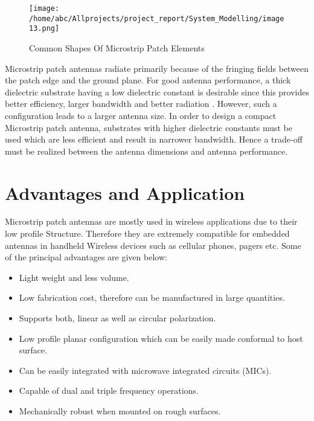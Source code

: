 \documentclass[12pt]{article}
\begin{document}
          \begin{figure}[H]
          	\centering
          	\texttt{[image: /home/abc/Allprojects/project\_report/System\_Modelling/image13.png]}
          	\caption{Common Shapes Of Microstrip Patch Elements}
          \end{figure}

           Microstrip patch antennas radiate primarily because of the fringing fields between the patch edge and the ground plane. For good antenna performance, a thick dielectric substrate having a low dielectric constant is desirable since this provides better efficiency, larger bandwidth and better radiation . However, such a configuration leads to a larger antenna size. In order to design a compact Microstrip patch antenna, substrates with higher dielectric constants must be used which are less efficient and result in narrower bandwidth. Hence a trade-off must be realized between the antenna dimensions and antenna performance.

          \cleardoublepage

           \section{Advantages and Application}
            \justify
             Microstrip patch antennas are mostly used in wireless applications due to their low profile Structure. Therefore they are extremely compatible for embedded antennas in handheld Wireless devices such as cellular phones, pagers etc.
             Some of the principal advantages are given below:
             \begin{itemize}
             	\item Light weight and less volume.
             	\item Low fabrication cost, therefore can be manufactured in large quantities.
             	\item Supports both, linear as well as circular polarization.
             	\item Low profile planar configuration which can be easily made conformal to host surface.
             	\item Can be easily integrated with microwave integrated circuits (MICs).
             	\item Capable of dual and triple frequency operations.
             	\item Mechanically robust when mounted on rough surfaces.
             \end{itemize}
\end{document}
